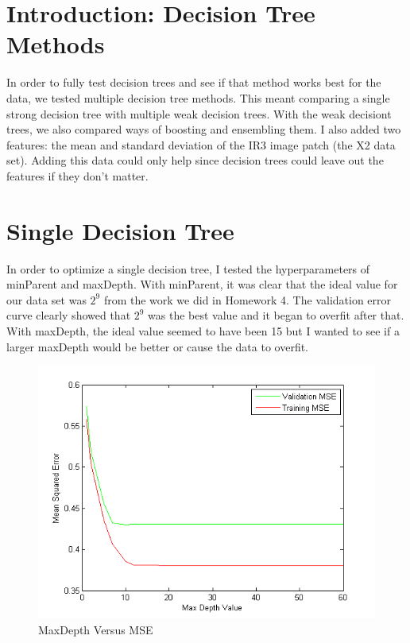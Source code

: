 \documentclass[twoside,11pt]{article}
\theoremstyle{definition}
\begin{document}
\section*{Introduction: Decision Tree Methods}

In order to fully test decision trees and see if that method works best for the data, we tested multiple decision tree methods. This meant comparing a single strong decision tree with multiple weak decision trees. With the weak decisiont trees, we also compared ways of boosting and ensembling them. I also added two features: the mean and standard deviation of the IR3 image patch (the X2 data set). Adding this data could only help since decision trees could leave out the features if they don't matter. 

\section*{Single Decision Tree} 

In order to optimize a single decision tree, I tested the hyperparameters of minParent and maxDepth. With minParent, it was clear that the ideal value for our data set was $2^9$ from the work we did in Homework 4. The validation error curve clearly showed that $2^9$ was the best value and it began to overfit after that. With maxDepth, the ideal value seemed to have been 15 but I wanted to see if a larger maxDepth would be better or cause the data to overfit. 
\begin{figure}[h]
\centering
\includegraphics[width=4 in]{maxDepthVersusMSE.png}
\caption{MaxDepth Versus MSE}
\end{figure}

\newpage 
\end{document}
